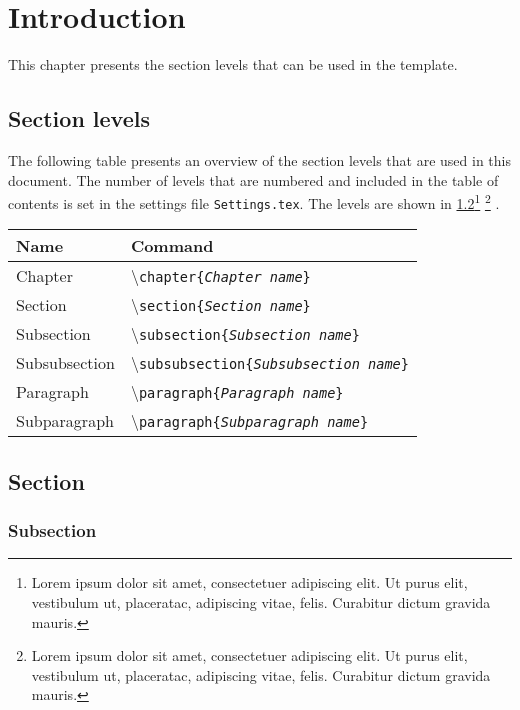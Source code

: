 \chapter{Introduction}
This chapter presents the section levels that can be used in the template.

\section{Section levels}
The following table presents an overview of the section levels that are used in this document. The number of levels that are numbered and included in the table of contents is set in the settings file \texttt{Settings.tex}. The levels are shown in \cref{sec:introduction_section}\footnote{
Lorem ipsum dolor sit amet, consectetuer adipiscing elit. Ut purus elit, vestibulum ut, placeratac, adipiscing vitae, felis. Curabitur dictum gravida mauris.}%
\footnotemarksep%
\footnote{Lorem ipsum dolor sit amet, consectetuer adipiscing elit. Ut purus elit, vestibulum ut, placeratac, adipiscing vitae, felis. Curabitur dictum gravida mauris.}%
.

\begin{table}[H]
\centering
\begin{tabular}{ll} \hline\hline
Name & Command\\ \hline
Chapter & \textbackslash\texttt{chapter\{\emph{Chapter name}\}}\\
Section & \textbackslash\texttt{section\{\emph{Section name}\}}\\
Subsection & \textbackslash\texttt{subsection\{\emph{Subsection name}\}}\\
Subsubsection & \textbackslash\texttt{subsubsection\{\emph{Subsubsection name}\}}\\
Paragraph & \textbackslash\texttt{paragraph\{\emph{Paragraph name}\}}\\
Subparagraph & \textbackslash\texttt{paragraph\{\emph{Subparagraph name}\}}\\ \hline\hline
\end{tabular}
\end{table}


\section{Section} \label{sec:introduction_section}
\subsection{Subsection}
